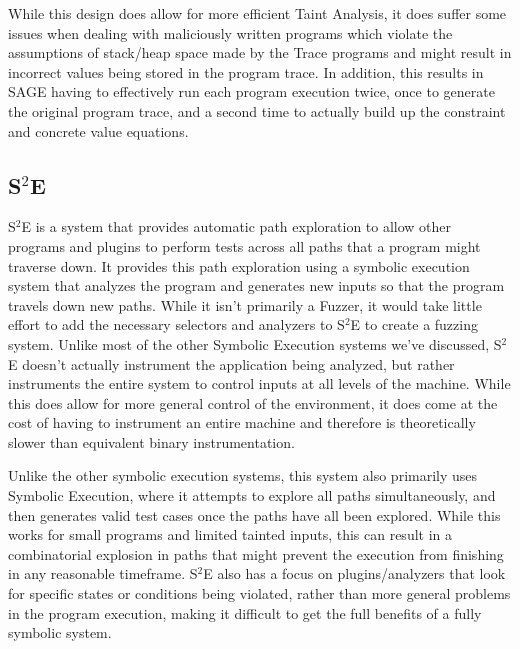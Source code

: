 While this design does allow for more efficient Taint Analysis, it does suffer
some issues when dealing with maliciously written programs which violate the
assumptions of stack/heap space made by the Trace programs and might result in
incorrect values being stored in the program trace. In addition, this results in
SAGE having to effectively run each program execution twice, once to generate
the original program trace, and a second time to actually build up the
constraint and concrete value equations.

\subsection{S$^2$E}
S$^2$E is a system that provides automatic path exploration to allow other
programs and plugins to perform tests across all paths that a program might
traverse down. It provides this path exploration using a symbolic execution
system that analyzes the program and generates new inputs so that the program
travels down new paths. While it isn't primarily a Fuzzer, it would take little
effort to add the necessary selectors and analyzers to S$^2$E to create a
fuzzing system. Unlike most of the other Symbolic Execution systems we've
discussed, S$^2$E doesn't actually instrument the application being analyzed,
but rather instruments the entire system to control inputs at all levels of the
machine. While this does allow for more general control of the environment, it
does come at the cost of having to instrument an entire machine and therefore is
theoretically slower than equivalent binary instrumentation. 

Unlike the other symbolic execution systems, this system also primarily uses
Symbolic Execution, where it attempts to explore all paths simultaneously, and
then generates valid test cases once the paths have all been explored. While
this works for small programs and limited tainted inputs, this can result in a
combinatorial explosion in paths that might prevent the execution from finishing
in any reasonable timeframe. S$^2$E also has a focus on plugins/analyzers that
look for specific states or conditions being violated, rather than more general
problems in the program execution, making it difficult to get the full benefits
of a fully symbolic system.
